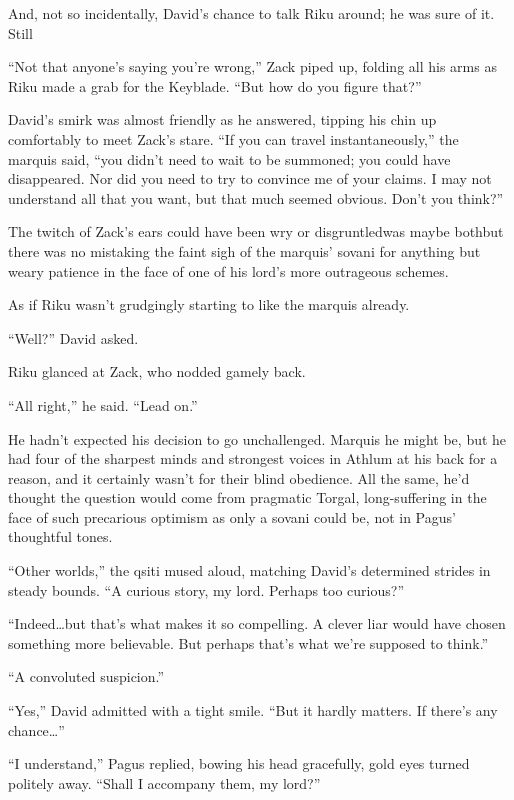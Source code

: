 And, not so incidentally, David's chance to talk Riku around; he was sure of it. Still\textemdash 

``Not that anyone's saying you're wrong,'' Zack piped up, folding all his arms as Riku made a grab for the Keyblade. ``But how do you figure that?''

David's smirk was almost friendly as he answered, tipping his chin up comfortably to meet Zack's stare. ``If you can travel instantaneously,'' the marquis said, ``you didn't need to wait to be summoned; you could have disappeared. Nor did you need to try to convince me of your claims. I may not understand all that you want, but that much seemed obvious. Don't you think?''

The twitch of Zack's ears could have been wry or disgruntled\textemdash was maybe both\textemdash but there was no mistaking the faint sigh of the marquis' sovani for anything but weary patience in the face of one of his lord's more outrageous schemes.

As if Riku wasn't grudgingly starting to like the marquis already.

``Well?'' David asked.

Riku glanced at Zack, who nodded gamely back.

``All right,'' he said. ``Lead on.''


\scenechange


He hadn't expected his decision to go unchallenged. Marquis he might be, but he had four of the sharpest minds and strongest voices in Athlum at his back for a reason, and it certainly wasn't for their blind obedience. All the same, he'd thought the question would come from pragmatic Torgal, long-suffering in the face of such precarious optimism as only a sovani could be, not in Pagus' thoughtful tones.

``Other worlds,'' the qsiti mused aloud, matching David's determined strides in steady bounds. ``A curious story, my lord. Perhaps too curious?''

``Indeed\ldots but that's what makes it so compelling. A clever liar would have chosen something more believable. But perhaps that's what we're supposed to think.''

``A convoluted suspicion.''

``Yes,'' David admitted with a tight smile. ``But it hardly matters. If there's any chance\ldots''

``I understand,'' Pagus replied, bowing his head gracefully, gold eyes turned politely away. ``Shall I accompany them, my lord?''

